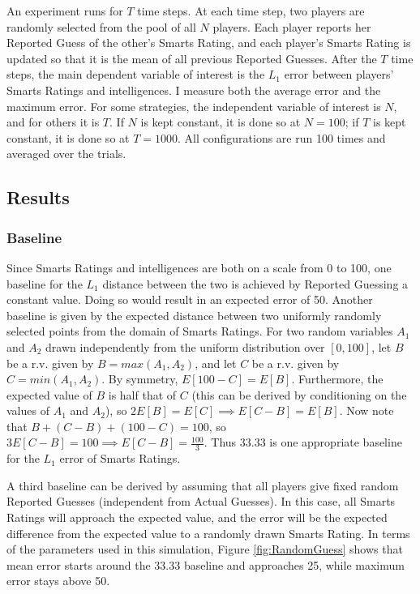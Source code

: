 An experiment runs for $T$ time steps. At each time step, two players are randomly selected from the pool of all $N$ players. Each player reports her Reported Guess of the other's Smarts Rating, and each player's Smarts Rating is updated so that it is the mean of all previous Reported Guesses. After the $T$ time steps, the main dependent variable of interest is the $L_1$ error between players' Smarts Ratings and intelligences. I measure both the average error and the maximum error. For some strategies, the independent variable of interest is $N$, and for others it is $T$. If $N$ is kept constant, it is done so at $N=100$; if $T$ is kept constant, it is done so at $T = 1000$. All configurations are run 100 times and averaged over the trials.

\subsection{Results}

\subsubsection{Baseline}

Since Smarts Ratings and intelligences are both on a scale from 0 to 100, one baseline for the $L_1$ distance between the two is achieved by Reported Guessing a constant value. Doing so would result in an expected error of 50. Another baseline is given by the expected distance between two uniformly randomly selected points from the domain of Smarts Ratings. For two random variables $A_1$ and $A_2$ drawn independently from the uniform distribution over $[0, 100]$, let $B$ be a r.v. given by $B = max(A_1, A_2)$, and let $C$ be a r.v. given by $C = min(A_1, A_2)$. By symmetry, $E[100 - C] = E[B]$. Furthermore, the expected value of $B$ is half that of $C$ (this can be derived by conditioning on the values of $A_1$ and $A_2$), so $2E[B] = E[C] \implies E[C-B] = E[B]$. Now note that $B + (C-B) + (100-C) = 100$, so $3E[C-B] = 100 \implies E[C-B] = \frac{100}{3}$. Thus $33.33$ is one appropriate baseline for the $L_1$ error of Smarts Ratings.

A third baseline can be derived by assuming that all players give fixed random Reported Guesses (independent from Actual Guesses). In this case, all Smarts Ratings will approach the expected value, and the error will be the expected difference from the expected value to a randomly drawn Smarts Rating. In terms of the parameters used in this simulation, Figure \ref{fig:RandomGuess} shows that mean error starts around the 33.33 baseline and approaches 25, while maximum error stays above 50. 


